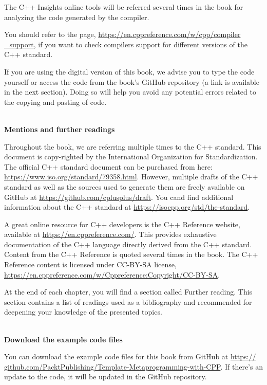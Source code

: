 The C++ Insights online tools will be referred several times in the book for analyzing the code generated by the compiler.

You should refer to the page, \url{https://en.cppreference.com/w/cpp/compiler
\_support}, if you want to check compilers support for different versions of the C++ standard.

If you are using the digital version of this book, we advise you to type the code yourself or access the code from the book’s GitHub repository (a link is available in the next section). Doing so will help you avoid any potential errors related to the copying and pasting of code.

\hspace*{\fill} \\ %
\noindent
\textbf{Mentions and further readings}

Throughout the book, we are referring multiple times to the C++ standard. This document is copy-righted by the International Organization for Standardization. The official C++ standard document can be purchased from here: \url{https://www.iso.org/standard/79358.html}. However, multiple drafts of the C++ standard as well as the sources used to generate them are freely available on GitHub at \url{https://github.com/cplusplus/draft}. You cand find additional information about the C++ standard at \url{https://isocpp.org/std/the-standard}.

A great online resource for C++ developers is the C++ Reference website, available at \url{https://en.cppreference.com/}. This provides exhaustive documentation of the C++ language directly derived from the C++ standard. Content from the C++ Reference is quoted several times in the book. The C++ Reference content is licensed under CC-BY-SA license, \url{https://en.cppreference.com/w/Cppreference:Copyright/CC-BY-SA}.

At the end of each chapter, you will find a section called Further reading. This section contains a list of readings used as a bibliography and recommended for deepening your knowledge of the presented topics.



\hspace*{\fill} \\ %
\noindent
\textbf{Download the example code files}

You can download the example code files for this book from GitHub at \url{https:// github.com/PacktPublishing/Template-Metaprogramming-with-CPP}.
If there’s an update to the code, it will be updated in the GitHub repository.

